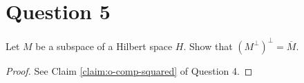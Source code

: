 \section{Question 5}

\horz

Let $M$ be a subspace of a Hilbert space $H$. Show that $(M^{\perp})^{\perp}= \overline{M}.$

\horz
\begin{proof}
    See Claim \ref{claim:o-comp-squared} of Question 4.
\end{proof}
